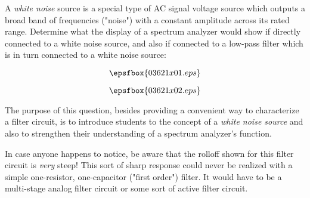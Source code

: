 

A {\it white noise} source is a special type of AC signal voltage source which outputs a broad band of frequencies ("noise") with a constant amplitude across its rated range.  Determine what the display of a spectrum analyzer would show if directly connected to a white noise source, and also if connected to a low-pass filter which is in turn connected to a white noise source:

$$\epsfbox{03621x01.eps}$$







$$\epsfbox{03621x02.eps}$$







The purpose of this question, besides providing a convenient way to characterize a filter circuit, is to introduce students to the concept of a {\it white noise source} and also to strengthen their understanding of a spectrum analyzer's function.

In case anyone happens to notice, be aware that the rolloff shown for this filter circuit is {\it very} steep!  This sort of sharp response could never be realized with a simple one-resistor, one-capacitor ("first order") filter.  It would have to be a multi-stage analog filter circuit or some sort of active filter circuit.




